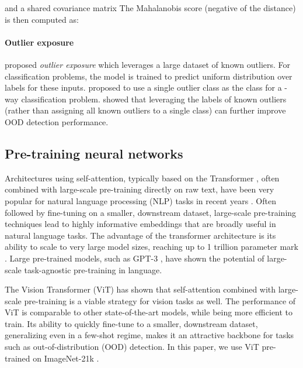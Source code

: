 \documentclass{article}
\begin{document}
and a shared covariance matrix 
The Mahalanobis score (negative of the distance) is then computed as:  






\vspace{-1em}
\paragraph{Outlier exposure}
\citet{hendrycks2018deep} proposed \emph{outlier exposure} which leverages a large dataset of known outliers.  For classification problems, the model is trained to predict uniform distribution over labels for these inputs. \citet{thulasidasan2021a} proposed to use a single outlier class as the  class for a -way classification problem. 
\citet{roy2021does} showed that leveraging the labels of known outliers (rather than assigning all known outliers to a single class) can further improve OOD detection performance. 






\vspace{-0.5em}
\subsection{Pre-training neural networks}

Architectures using self-attention, typically based on the Transformer \citep{vaswani2017attention}, often combined with large-scale pre-training directly on raw text, have been very popular for natural language processing (NLP) tasks in recent years \citep{devlin2018bert, NIPS2015_7137debd, peters2018deep, Howard_2018, radford2018improving, raffel2019exploring}. Often followed by fine-tuning on a smaller, downstream dataset, large-scale pre-training techniques lead to highly informative embeddings that are broadly useful in natural language tasks. The advantage of the transformer architecture is its ability to scale to very large model sizes, reaching up to  1 trillion parameter mark \citep{fedus2021switch}. Large pre-trained models, such as  GPT-3 \citep{brown2020language}, have shown the potential of large-scale task-agnostic pre-training in language. 

The Vision Transformer (ViT) \citep{dosovitskiy2020image} has shown that self-attention combined with large-scale pre-training is a viable strategy for vision tasks as well. The performance of ViT is comparable to other state-of-the-art models, while being more efficient to train. Its ability to quickly fine-tune to a smaller, downstream dataset, generalizing even in a few-shot regime, makes it an attractive backbone for tasks such as out-of-distribution (OOD) detection. In this paper, we use ViT pre-trained on ImageNet-21k \citep{ridnik2021imagenet21k}.
\end{document}
